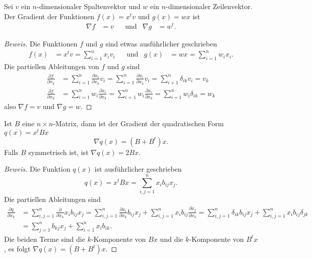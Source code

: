 \begin{lemma}
\label{buch:qm:lemma:gradlin}
Sei $v$ ein $n$-dimensionaler Spaltenvektor und $w$ ein $n$-dimensionaler
Zeilenvektor.
Der Gradient der Funktionen $f(x)=x^tv$ und $g(x)=wx$ ist
\begin{equation}
\begin{aligned}
\nabla f &= v
&&\text{und}&
\nabla g &= w^t.
\end{aligned}
\end{equation}
\end{lemma}

\begin{proof}[Beweis]
Die Funktionen $f$ und $g$ sind etwas ausführlicher geschrieben
\[
\begin{aligned}
f(x) &= x^tv = \sum_{i=1}^n x_iv_i
&&\text{und}&
g(x) &= wx = \sum_{i=1}^n w_ix_i.
\end{aligned}
\]
Die partiellen Ableitungen von $f$ und $g$ sind
\begin{align*}
\frac{\partial f}{\partial x_k}
&=
\sum_{i=1}^n \frac{\partial x_i}{\partial x_k} v_i
=
\sum_{i=1}^n \frac{\partial x_i}{\partial x_k} v_i
=
\sum_{i+1}^n \delta_{ik} v_i
=
v_k
\\
\frac{\partial f}{\partial x_k}
&=
\sum_{i=1}^n w_i\frac{\partial x_i}{\partial x_k}
=
\sum_{i=1}^n w_i\frac{\partial x_i}{\partial x_k}
=
\sum_{i+1}^n w_i\delta_{ik} =w_k
\end{align*}
also
$\nabla f = v$ und $\nabla g = w$.
\end{proof}

\begin{lemma}
\label{buch:qm:lemma:gradsquare}
Ist $B$ eine $n\times n$-Matrix, dann ist der Gradient der
quadratischen Form $q(x) = x^tBx$
\begin{equation}
\nabla q(x) = (B+B^t)x.
\end{equation}
Falls $B$ symmetrisch ist, ist $\nabla q(x) = 2Bx$.
\end{lemma}

\begin{proof}[Beweis]
Die Funktion $q(x)$ ist ausführlicher geschrieben
\[
q(x) = x^tBx = \sum_{i,j=1}^n x_ib_{ij}x_j.
\]
Die partiellen Ableitungen sind
\begin{align*}
\frac{\partial q}{\partial x_k}
&=
\sum_{i,j=1}^n \frac{\partial}{\partial x_k} x_ib_{ij}x_j
=
\sum_{i,j=1}^n \frac{\partial x_i}{\partial x_k} b_{ij}x_j
+
\sum_{i,j=1}^n x_ib_{ij}\frac{\partial x_j}{\partial x_k}
=
\sum_{i,j=1}^n \delta_{ik} b_{ij}x_j
+
\sum_{i,j=1}^n x_ib_{ij}\delta_{jk}
\\
&=
\sum_{j=1}^n b_{kj}x_j
+
\sum_{i=1}^n x_ib_{ik}.
\end{align*}
Die beiden Terme sind die $k$-Komponente von $Bx$ und die $k$-Komponente von
$B^tx$, es folgt $\nabla q(x) = (B+B^t)x$.
\end{proof}


